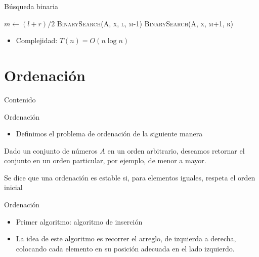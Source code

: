 \documentclass[]{beamer}
\begin{document}
\begin{frame}{B\'usqueda binaria}
  \begin{algorithm}[H]
    \BlankLine
    $m \leftarrow (l+r)/2$
    \BlankLine
    {
      \textsc{BinarySearch(A, x, l, m-1)}
    }
    {
      \textsc{BinarySearch(A, x, m+1, r)}
    }
    {
    }
  \end{algorithm}
  \pause
  \begin{itemize}
    \item Complejidad: \pause $T(n)=O(n \log n)$
  \end{itemize}
\end{frame}

\section{Ordenaci\'on}
\begin{frame}{Contenido}
\tableofcontents[currentsection]
\end{frame}

\begin{frame}{Ordenaci\'on}
  \begin{itemize}
    \item Definimos el problema de ordenaci\'on de la siguiente manera
  \end{itemize}
  \begin{definition}
    Dado un conjunto de n\'umeros $A$ en un orden arbitrario, deseamos retornar
    el conjunto en un orden particular, por ejemplo, de menor a mayor.
  \end{definition}

  \begin{definition}
    Se dice que una ordenaci\'on es estable si, para elementos iguales, respeta el orden inicial
  \end{definition}
\end{frame}

\begin{frame}{Ordenaci\'on}
  \begin{itemize}
    \item Primer algoritmo: algoritmo de inserci\'on
      \pause
    \item La idea de este algoritmo es recorrer el arreglo, de izquierda a
      derecha, colocando cada elemento en su posici\'on adecuada en el lado
      izquierdo.
  \end{itemize}
\end{frame}
\end{document}
